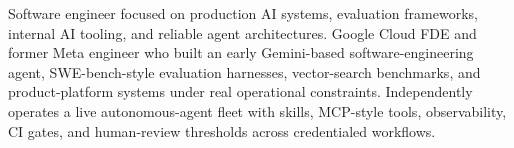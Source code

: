 


Software engineer focused on production AI systems, evaluation frameworks, internal AI tooling, and reliable agent architectures. Google Cloud FDE and former Meta engineer who built an early Gemini-based software-engineering agent, SWE-bench-style evaluation harnesses, vector-search benchmarks, and product-platform systems under real operational constraints. Independently operates a live autonomous-agent fleet with skills, MCP-style tools, observability, CI gates, and human-review thresholds across credentialed workflows.







